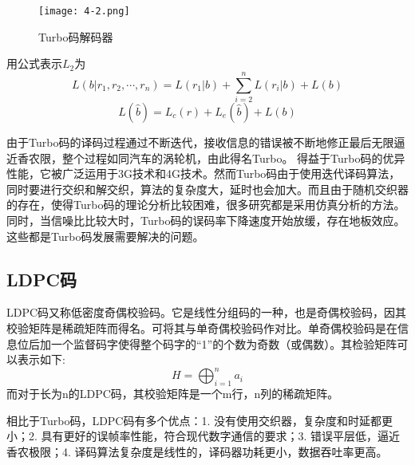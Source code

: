 \documentclass{article}
\begin{document}
\begin{figure}[h]
  \centering
  \texttt{[image: 4-2.png]}
  \caption{Turbo码解码器}
\end{figure}
用公式表示$L_2$为
\begin{equation}
    L(b|r_1, r_2, \cdots, r_n) = L(r_1|b) + \sum_{i = 2}^{n} L(r_i|b) + L(b)
\end{equation}
\begin{equation}
    L(\hat{b}) = L_c(r) + L_e(\hat{b}) + L(b)
\end{equation}

由于Turbo码的译码过程通过不断迭代，接收信息的错误被不断地修正最后无限逼近香农限，整个过程如同汽车的涡轮机，由此得名Turbo。
得益于Turbo码的优异性能，它被广泛运用于3G技术和4G技术。然而Turbo码由于使用迭代译码算法，同时要进行交织和解交织，算法的复杂度大，延时也会加大。而且由于随机交织器的存在，使得Turbo码的理论分析比较困难，很多研究都是采用仿真分析的方法。同时，当信噪比比较大时，Turbo码的误码率下降速度开始放缓，存在地板效应。这些都是Turbo码发展需要解决的问题。

\subsection{LDPC码}
LDPC码又称低密度奇偶校验码。它是线性分组码的一种，也是奇偶校验码，因其校验矩阵是稀疏矩阵而得名。可将其与单奇偶校验码作对比。单奇偶校验码是在信息位后加一个监督码字使得整个码字的“1”的个数为奇数（或偶数）。其检验矩阵可以表示如下:
\begin{equation}
    H = \bigoplus_{i=1}^{n} a_i
\end{equation}
而对于长为n的LDPC码，其校验矩阵是一个m行，n列的稀疏矩阵。

相比于Turbo码，LDPC码有多个优点：1. 没有使用交织器，复杂度和时延都更小；2. 具有更好的误帧率性能，符合现代数字通信的要求；3. 错误平层低，逼近香农极限；4. 译码算法复杂度是线性的，译码器功耗更小，数据吞吐率更高。\cite{bai2016channel}
\end{document}
